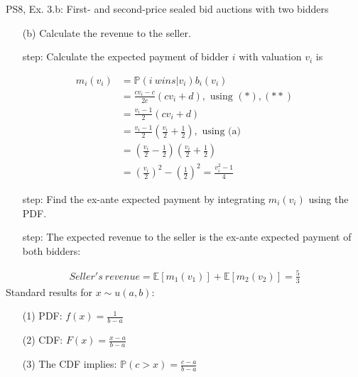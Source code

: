\begin{frame}{PS8, Ex. 3.b: First- and second-price sealed bid auctions with two bidders}
    \begin{multicols}{2}
      \begin{itemize}
        \item[(b)] Calculate the revenue to the seller.
        \item[\nth{1} step:] Calculate the expected payment of bidder $i$ with valuation $v_i$ is
      \end{itemize}
      \vspace{-12pt}
      \begin{align*}
        m_i(v_i)&=\mathbb{P}(i\ wins|v_i)b_i(v_i)\\
                &=\frac{cv_i-c}{2c}(cv_i+d),\text{ using }(*),(**)\\
                &=\frac{v_i-1}{2}(cv_i+d)\\
                &=\frac{v_i-1}{2}\left(\frac{v_i}{2}+\frac{1}{2}\right),\text{ using (a)}\\
                &=\left(\frac{v_i}{2}-\frac{1}{2}\right)\left(\frac{v_i}{2}+\frac{1}{2}\right)\\
                &=\left(\frac{v_i}{2}\right)^2-\left(\frac{1}{2}\right)^2
                 =\frac{v_i^2-1}{4}
      \end{align*}
      \vspace{-18pt}
      \begin{itemize}
        \item[\nth{2} step:] Find the ex-ante expected payment by integrating $m_i(v_i)$ using the PDF.
        \item[\nth{3} step:] The expected revenue to the seller is the ex-ante expected payment of both bidders:
      \end{itemize}
      \vspace{-8pt}
      \begin{align*}
        Seller's\ revenue=\mathbb{E}[m_1(v_1)]+\mathbb{E}[m_2(v_2)]=\frac{5}{3}
      \end{align*}
      \vfill\null\columnbreak
      Standard results for $x\sim u(a, b):$
      \vspace{-6pt}
      \begin{enumerate}
        \item[(1)] PDF: $f(x)=\frac{1}{b-a}$
        \item[(2)] CDF: $F(x)=\frac{x-a}{b-a}$
        \item[(3)] The CDF implies: $\mathbb{P}(c>x)=\frac{c-a}{b-a}$

\end{enumerate}
\end{multicols}
\end{frame}
